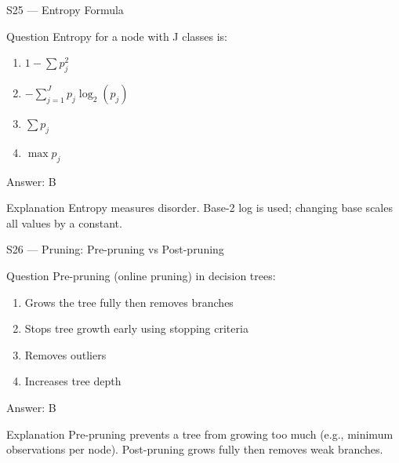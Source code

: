 \documentclass[aspectratio=169,8pt]{beamer}
\begin{document}
	\begin{frame}{S25 --- Entropy Formula}
		\begin{block}{Question}
			Entropy for a node with J classes is:
			\begin{enumerate}
				\item $1 - \sum p_j^2$
				\item $-\sum_{j=1}^{J} p_j \log_2(p_j)$
				\item $\sum p_j$
				\item $\max p_j$
			\end{enumerate}
		\end{block}
		\begin{exampleblock}{Answer: B}\end{exampleblock}
		\begin{block}{Explanation}
			Entropy measures disorder. Base-2 log is used; changing base scales all values by a constant.
		\end{block}
	\end{frame}
	
	\begin{frame}{S26 --- Pruning: Pre-pruning vs Post-pruning}
		\begin{block}{Question}
			Pre-pruning (online pruning) in decision trees:
			\begin{enumerate}
				\item Grows the tree fully then removes branches
				\item Stops tree growth early using stopping criteria
				\item Removes outliers
				\item Increases tree depth
			\end{enumerate}
		\end{block}
		\begin{exampleblock}{Answer: B}\end{exampleblock}
		\begin{block}{Explanation}
			Pre-pruning prevents a tree from growing too much (e.g., minimum observations per node). Post-pruning grows fully then removes weak branches.
		\end{block}
	\end{frame}
	
\end{document}
